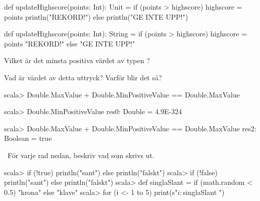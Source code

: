 \SubtaskSolved
\begin{Code}
def updateHighscore(points: Int): Unit =
  if (points > highscore) {
    highscore = points
    println("REKORD!")
  } else println("GE INTE UPP!")
\end{Code}

\SubtaskSolved
\begin{Code}
def updateHighscore(points: Int): String =
  if (points > highscore) {
    highscore = points
    "REKORD!"
  } else "GE INTE UPP!"
\end{Code}



\QUESTEND



\QUESTBEGIN

\Task \what

\Subtask Vilket är det minsta positiva värdet av typen ?

\Subtask Vad är värdet av detta uttryck? Varför blir det så?
\begin{REPL}
scala> Double.MaxValue + Double.MinPositiveValue == Double.MaxValue
\end{REPL}

\SOLUTION

\TaskSolved \what

\SubtaskSolved

\begin{REPL}
scala> Double.MinPositiveValue
res0: Double = 4.9E-324
\end{REPL}

\SubtaskSolved

\begin{REPL}
scala> Double.MaxValue + Double.MinPositiveValue == Double.MaxValue
res2: Boolean = true
\end{REPL}

\QUESTEND




\QUESTBEGIN

\Task \what~För varje rad nedan, beskriv vad som skrivs ut.  %
\begin{REPL}
scala> if (!true) println("sant") else println("falskt")
scala> if (!false) println("sant") else println("falskt")
scala> def singlaSlant = if (math.random < 0.5) "krona" else "klave"
scala> for (i <- 1 to 5) print(s"$i:$singlaSlant ")
\end{REPL}

\SOLUTION

